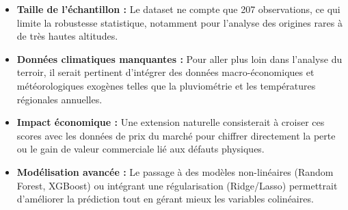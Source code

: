 \documentclass[12pt,a4paper]{article}
\begin{document}
\begin{itemize}[noitemsep]
  \item \textbf{Taille de l'échantillon :} Le dataset ne compte que 207 observations, ce qui limite la robustesse statistique, notamment pour l'analyse des origines rares à de très hautes altitudes.
  \item \textbf{Données climatiques manquantes :} Pour aller plus loin dans l'analyse du terroir, il serait pertinent d'intégrer des données macro-économiques et météorologiques exogènes telles que la pluviométrie et les températures régionales annuelles.
  \item \textbf{Impact économique :} Une extension naturelle consisterait à croiser ces scores avec les données de prix du marché pour chiffrer directement la perte ou le gain de valeur commerciale lié aux défauts physiques.
  \item \textbf{Modélisation avancée :} Le passage à des modèles non-linéaires (Random Forest, XGBoost) ou intégrant une régularisation (Ridge/Lasso) permettrait d'améliorer la prédiction tout en gérant mieux les variables colinéaires.
\end{itemize}
\end{document}
